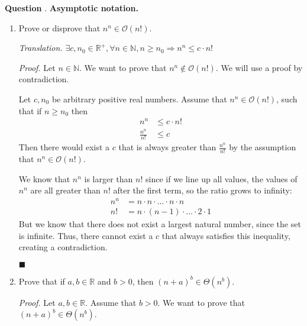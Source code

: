 \documentclass{article}
\newcounter{qcount}
\newcommand\q{\stepcounter{qcount} \textbf{Question \theqcount}. }
\newcommand\qedsymbol{\hfill$\blacksquare$}
\begin{document}
\newpage
\q \textbf{Asymptotic notation.}
\begin{enumerate}[label = (\alph*)]  
    \item Prove or disprove that $n^n \in \mathcal{O} (n!)$.

        \textit{Translation.} $\exists c, n_0 \in \mathbb{R}^+, 
        \forall n \in \mathbb{N}, n \geq n_0 \Rightarrow n^n \leq 
        c \cdot n!$

        \textit{Proof.} 
        Let $n \in \mathbb{N}$. 
        We want to prove 
        that $n^n \notin \mathcal{O} (n!)$. We will use a proof by contradiction. 
            
        Let $c, n_0$ be arbitrary positive real numbers. 
        Assume that $n^n \in \mathcal{O} (n!)$, such that if $n \geq n_0 
        $ then 
        \begin{align*}
            n^n &\leq c \cdot n! \\
            \frac{n^n}{n!} &\leq c
        \end{align*} 
        Then there would exist a $c$ that is always greater than 
        $\frac{n^n}{n!}$ by the assumption that $n^n \in \mathcal{O} (n!)$. 
        
        We know that $n^n$ is larger than $n!$ since if we line up 
        all values, the values of $n^n$ are all greater than $n!$ after 
        the first term, so the ratio grows to infinity:
        \begin{align*}
            n^n &= n \cdot n \cdot \ldots \cdot n \cdot n \tag*{($n$ terms)} \\
            n! &= n \cdot (n - 1) \cdot \ldots \cdot 2 \cdot 1 \tag*{($n$ terms)}
        \end{align*}
        But we know that there does not exist a largest natural number, 
        since the set is infinite. Thus, there cannot exist a $c$ that 
        always satisfies this inequality, creating a contradiction.
        
        \qedsymbol
        
    \item Prove that if $a, b \in \mathbb{R}$ and $b > 0$, then 
        $ (n + a)^b \in \Theta (n^b)$.

        \textit{Proof.} Let $a, b \in \mathbb{R}$. Assume that 
        $b > 0$. We want to prove that $ (n+a)^b \in \Theta (n^b)$. 
        

\end{enumerate}
\end{document}
